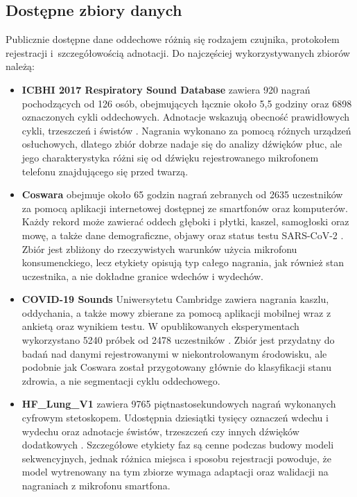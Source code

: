 \subsection{Dostępne zbiory danych}

Publicznie dostępne dane oddechowe różnią się rodzajem czujnika, protokołem rejestracji i~szczegółowością adnotacji. Do najczęściej wykorzystywanych zbiorów należą:

\begin{itemize}
    \item \textbf{ICBHI 2017 Respiratory Sound Database} zawiera 920 nagrań pochodzących od 126 osób, obejmujących łącznie około 5,5 godziny oraz 6898 oznaczonych cykli oddechowych. Adnotacje wskazują obecność prawidłowych cykli, trzeszczeń i świstów \cite{rocha2019respiratoryDatabase}. Nagrania wykonano za pomocą różnych urządzeń osłuchowych, dlatego zbiór dobrze nadaje się do analizy dźwięków płuc, ale jego charakterystyka różni się od dźwięku rejestrowanego mikrofonem telefonu znajdującego się przed twarzą.

    \item \textbf{Coswara} obejmuje około 65 godzin nagrań zebranych od 2635 uczestników za pomocą aplikacji internetowej dostępnej ze smartfonów oraz komputerów. Każdy rekord może zawierać oddech głęboki i płytki, kaszel, samogłoski oraz mowę, a także dane demograficzne, objawy oraz status testu SARS-CoV-2 \cite{bhattacharya2023coswara}. Zbiór jest zbliżony do rzeczywistych warunków użycia mikrofonu konsumenckiego, lecz etykiety opisują typ całego nagrania, jak również stan uczestnika, a nie dokładne granice wdechów i wydechów.

    \item \textbf{COVID-19 Sounds} Uniwersytetu Cambridge zawiera nagrania kaszlu, oddychania, a także mowy zbierane za pomocą aplikacji mobilnej wraz z ankietą oraz wynikiem testu. W opublikowanych eksperymentach wykorzystano 5240 próbek od 2478 uczestników \cite{han2022covidSounds}. Zbiór jest przydatny do badań nad danymi rejestrowanymi w niekontrolowanym środowisku, ale podobnie jak Coswara został przygotowany głównie do klasyfikacji stanu zdrowia, a nie segmentacji cyklu oddechowego.

    \item \textbf{HF\_Lung\_V1} zawiera 9765 piętnastosekundowych nagrań wykonanych cyfrowym stetoskopem. Udostępnia dziesiątki tysięcy oznaczeń wdechu i wydechu oraz adnotacje świstów, trzeszczeń czy innych dźwięków dodatkowych \cite{hsu2021hfLung}. Szczegółowe etykiety faz są cenne podczas budowy modeli sekwencyjnych, jednak różnica miejsca i sposobu rejestracji powoduje, że model wytrenowany na tym zbiorze wymaga adaptacji oraz walidacji na nagraniach z mikrofonu smartfona.


\end{itemize}
